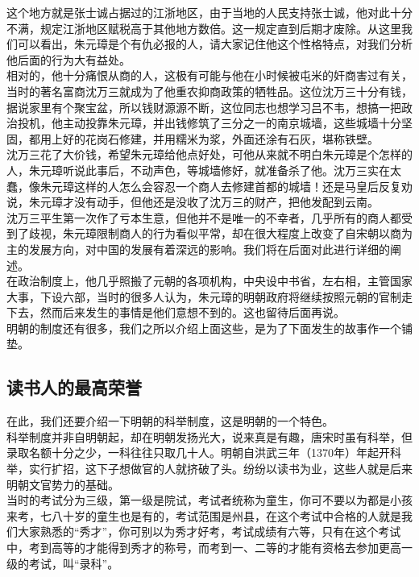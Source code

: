 \begin{multicols}{\theparacolNo}
这个地方就是张士诚占据过的江浙地区，由于当地的人民支持张士诚，他对此十分不满，规定江浙地区赋税高于其他地方数倍。这一规定直到后期才废除。从这里我们可以看出，朱元璋是个有仇必报的人，请大家记住他这个性格特点，对我们分析他后面的行为大有益处。\\

相对的，他十分痛恨从商的人，这极有可能与他在小时候被屯米的奸商害过有关，当时的著名富商沈万三就成为了他重农抑商政策的牺牲品。这位沈万三十分有钱，据说家里有个聚宝盆，所以钱财源源不断，这位同志也想学习吕不韦，想搞一把政治投机，他主动投靠朱元璋，并出钱修筑了三分之一的南京城墙，这些城墙十分坚固，都用上好的花岗石修建，并用糯米为浆，外面还涂有石灰，堪称铁壁。\\

沈万三花了大价钱，希望朱元璋给他点好处，可他从来就不明白朱元璋是个怎样的人，朱元璋听说此事后，不动声色，等城墙修好，就准备杀了他。沈万三实在太蠢，像朱元璋这样的人怎么会容忍一个商人去修建首都的城墙！还是马皇后反复劝说，朱元璋才没有动手，但他还是没收了沈万三的财产，把他发配到云南。\\

沈万三平生第一次作了亏本生意，但他并不是唯一的不幸者，几乎所有的商人都受到了歧视，朱元璋限制商人的行为看似平常，却在很大程度上改变了自宋朝以商为主的发展方向，对中国的发展有着深远的影响。我们将在后面对此进行详细的阐述。\\

在政治制度上，他几乎照搬了元朝的各项机构，中央设中书省，左右相，主管国家大事，下设六部，当时的很多人认为，朱元璋的明朝政府将继续按照元朝的官制走下去，然而后来发生的事情是他们意想不到的。这也留待后面再说。\\

明朝的制度还有很多，我们之所以介绍上面这些，是为了下面发生的故事作一个铺垫。\\

\subsection{读书人的最高荣誉}
在此，我们还要介绍一下明朝的科举制度，这是明朝的一个特色。\\

科举制度并非自明朝起，却在明朝发扬光大，说来真是有趣，唐宋时虽有科举，但录取名额十分之少，一科往往只取几十人。明朝自洪武三年（1370年）年起开科举，实行扩招，这下子想做官的人就挤破了头。纷纷以读书为业，这些人就是后来明朝文官势力的基础。\\

当时的考试分为三级，第一级是院试，考试者统称为童生，你可不要以为都是小孩来考，七八十岁的童生也是有的，考试范围是州县，在这个考试中合格的人就是我们大家熟悉的“秀才”，你可别以为秀才好考，考试成绩有六等，只有在这个考试中，考到高等的才能得到秀才的称号，而考到一、二等的才能有资格去参加更高一级的考试，叫“录科”。\\


\end{multicols}
